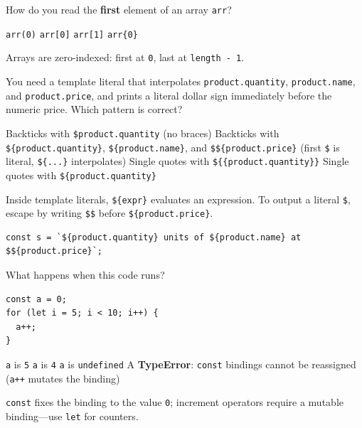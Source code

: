 \question[4]
How do you read the \textbf{first} element of an array \texttt{arr}?
\begin{choices}
  \choice \texttt{arr(0)}
  \CorrectChoice \texttt{arr[0]}
  \choice \texttt{arr[1]}
  \choice \texttt{arr\{0\}}
\end{choices}
\begin{solution}
  Arrays are zero-indexed: first at \texttt{0}, last at \texttt{length - 1}.
\end{solution}

\question[4]
You need a template literal that interpolates \texttt{product.quantity}, \texttt{product.name}, and \texttt{product.price}, and prints a literal dollar sign immediately before the numeric price. Which pattern is correct?
\begin{choices}
  \choice Backticks with \texttt{\$product.quantity} (no braces)
  \CorrectChoice Backticks with \texttt{\$\{product.quantity\}}, \texttt{\$\{product.name\}}, and \texttt{\$\$\{product.price\}} (first \texttt{\$} is literal, \texttt{\$\{...\}} interpolates)
  \choice Single quotes with \texttt{\$\{\{product.quantity\}\}}
  \choice Single quotes with \texttt{\$\{product.quantity\}}
\end{choices}
\begin{solution}
  Inside template literals, \texttt{\$\{expr\}} evaluates an expression. To output a literal \texttt{\$}, escape by writing \texttt{\$\$} before \texttt{\$\{product.price\}}.
\begin{lstlisting}[style=js]
const s = `${product.quantity} units of ${product.name} at $${product.price}`;
\end{lstlisting}
\end{solution}

\question[4]
What happens when this code runs?
\begin{lstlisting}[style=js]
const a = 0;
for (let i = 5; i < 10; i++) {
  a++;
}
\end{lstlisting}
\begin{choices}
  \choice \texttt{a} is \texttt{5}
  \choice \texttt{a} is \texttt{4}
  \choice \texttt{a} is \texttt{undefined}
  \CorrectChoice A \textbf{TypeError}: \texttt{const} bindings cannot be reassigned (\texttt{a++} mutates the binding)
\end{choices}
\begin{solution}
  \texttt{const} fixes the binding to the value \texttt{0}; increment operators require a mutable binding---use \texttt{let} for counters.
\end{solution}

